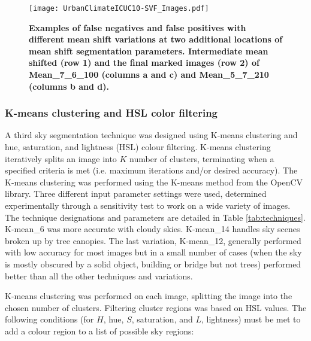 \documentclass[final,3p,times,authoryear]{elsarticle}
\begin{document}
%

\begin{figure}
\centering   
\texttt{[image: UrbanClimateICUC10-SVF\_Images.pdf]} 
\caption{\bf Examples of false negatives and false positives with different mean shift variations at two additional locations of mean shift segmentation parameters. Intermediate mean shifted (row 1) and the final marked images (row 2) of Mean\_7\_6\_100 (columns a and c) and Mean\_5\_7\_210 (columns b and d).}    
 \label{fig:meanerrors}  
\end{figure} 



\subsubsection{K-means clustering and HSL color filtering}\label{sec:kmeans}
A third sky segmentation technique was designed using K-means clustering and hue, saturation, and lightness (HSL) colour filtering. K-means clustering iteratively splits an image into $K$ number of clusters, terminating when a specified criteria is met (i.e. maximum iterations and/or desired accuracy). The K-means clustering was performed using the K-means method from the OpenCV library. Three different input parameter settings were used, determined experimentally through a sensitivity test to work on a wide variety of images. The technique designations and parameters are detailed in Table \ref{tab:techniques}. K-mean\_6 was more accurate with cloudy skies. K-mean\_14 handles sky scenes broken up by tree canopies. The last variation, K-mean\_12, generally performed with low accuracy for most images but in a small number of cases (when the sky is mostly obscured by a solid object, building or bridge but not trees) performed better than all the other techniques and variations. 

K-means clustering was performed on each image, splitting the image into the chosen number of clusters. Filtering cluster regions was based on HSL values. The following conditions (for $H$, hue, $S$, saturation, and $L$, lightness) must be met to add a colour region to a list of possible sky regions: 
\end{document}

